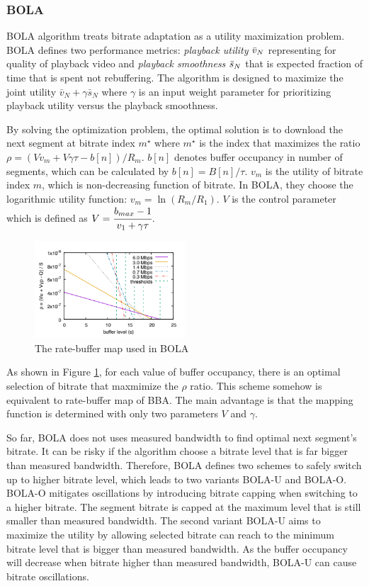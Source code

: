 \documentclass[journal]{IEEEtran}
\begin{document}
\subsubsection{BOLA}
BOLA algorithm \cite{BOLA} treats bitrate adaptation as a
utility maximization problem. BOLA defines two performance metrics: \textit{playback utility} $\Bar{v}_N$ representing for quality of playback video and \textit{playback smoothness} $\Bar{s}_N$ that is expected
fraction of time that is spent not rebuffering. The algorithm is designed to maximize the joint utility $\bar{v}_{N}+\gamma\bar{s}_{N}$ where $\gamma$ is an input weight parameter for
prioritizing playback utility versus the playback smoothness.
\par By solving the optimization problem, the optimal solution is to download the next segment at bitrate index $m^{\star}$ where $m^{\star}$ is the index that maximizes the ratio $\rho=(Vv_{m}+V\gamma\tau-b[n])/R_{m}$.
$b[n]$ denotes buffer occupancy in number of segments, which can be calculated by $b[n] = B[n]/\tau$. $v_m$ is the utility of bitrate index $m$, which is non-decreasing function of bitrate. In BOLA, they choose the logarithmic utility function: $v_m=\ln(R_m/R_1)$.  
$V$ is the control parameter which is defined as $V = \cfrac{b_{max}-1}{v_{1}+\gamma\tau}$.
\begin{figure}[!h]
	\centering
	
	\includegraphics[width=0.5\textwidth]{images/BOLA.PNG}
	
	
	
	\caption{The rate-buffer map used in BOLA}
	\label {BOLA}
	
\end{figure} 
\par As shown in Figure \ref{BOLA}, for each value of buffer occupancy, there is an optimal selection of bitrate that maxmimize the $\rho$ ratio. This scheme somehow is equivalent to rate-buffer map of BBA. The main advantage is that the mapping function is determined with only two parameters $V$ and $\gamma$.
\par So far, BOLA does not uses measured bandwidth to find optimal next segment's bitrate. It can be risky if the algorithm choose a bitrate level that is far bigger than measured bandwidth. Therefore, BOLA defines two schemes to safely switch up to higher bitrate level, which leads to two variants BOLA-U and BOLA-O. BOLA-O mitigates oscillations
by introducing bitrate capping when
switching to a higher bitrate. The segment bitrate is capped at the maximum level that is still smaller than measured bandwidth. The second variant BOLA-U aims to maximize the utility by allowing selected bitrate can reach to the minimum bitrate level that is bigger than measured bandwidth. As the buffer occupancy will decrease when bitrate higher than measured bandwidth, BOLA-U can cause bitrate oscillations.
\end{document}
